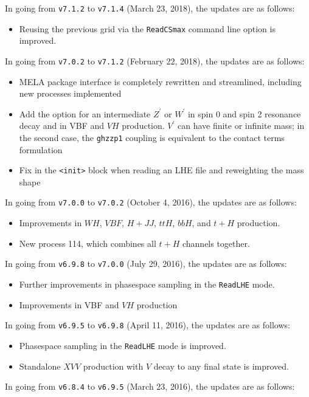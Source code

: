 \documentclass[aps,superscriptaddress,nofootinbib]{revtex4}
\begin{document}
\noindent
In going from \verb|v7.1.2| to \verb|v7.1.4| (March 23, 2018), the updates are as follows:
\begin{itemize}
\item Reusing the previous grid via the \verb|ReadCSmax| command line option is improved.
\end{itemize}
\noindent
In going from \verb|v7.0.2| to \verb|v7.1.2| (February 22, 2018), the updates are as follows:
\begin{itemize}
\item MELA package interface is completely rewritten and streamlined, including new processes implemented
\item Add the option for an intermediate $Z^\prime$ or $W^\prime$ in spin 0 and spin 2 resonance decay and in VBF and $VH$ production.  $V^\prime$ can have finite or infinite mass; in the second case, the \verb|ghzzp1| coupling is equivalent to the contact terms formulation~\cite{Gonzalez-Alonso:2014eva}
\item Fix in the \verb|<init>| block when reading an LHE file and reweighting the mass shape
\end{itemize}
\noindent
In going from \verb|v7.0.0| to \verb|v7.0.2| (October 4, 2016), the updates are as follows:
\begin{itemize}
\item Improvements in $WH$, $VBF$, $H+JJ$, $ttH$, $bbH$, and $t+H$ production.
\item New process 114, which combines all $t+H$ channels together.
\end{itemize}
\noindent
In going from \verb|v6.9.8| to \verb|v7.0.0| (July 29, 2016), the updates are as follows:
\begin{itemize}
\item Further improvements in phasespace sampling in the \verb|ReadLHE| mode.
\item Improvements in VBF and $VH$ production
\end{itemize}
\noindent
In going from \verb|v6.9.5| to \verb|v6.9.8| (April 11, 2016), the updates are as follows:
\begin{itemize}
\item Phasespace sampling in the \verb|ReadLHE| mode is improved.
\item Standalone $XVV$ production with $V$ decay to any final state is improved.
\end{itemize}
\noindent
In going from \verb|v6.8.4| to \verb|v6.9.5| (March 23, 2016), the updates are as follows:
\end{document}
